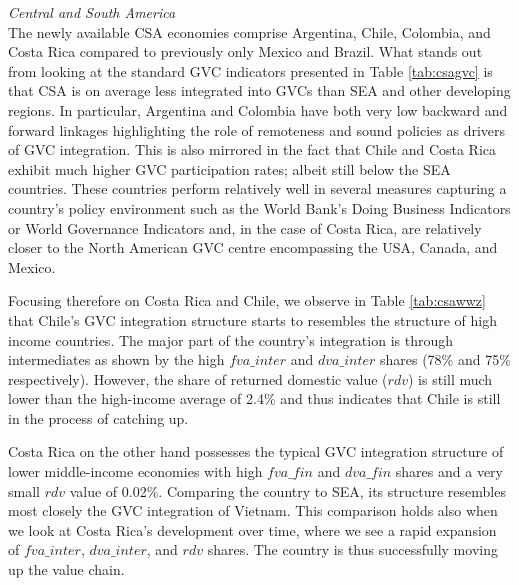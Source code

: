 \documentclass[a4paper,11pt]{article}
\begin{document}
\textit{Central and South America}\\
The newly available CSA economies comprise Argentina, Chile, Colombia, and Costa Rica compared to previously only Mexico and Brazil. What stands out from looking at the standard GVC indicators presented in Table \ref{tab:csagvc} is that CSA is on average less integrated into GVCs than SEA and other developing regions. In particular, Argentina and Colombia have both very low backward and forward linkages highlighting the role of remoteness and sound policies as drivers of GVC integration. This is also mirrored in the fact that Chile and Costa Rica exhibit much higher GVC participation rates; albeit still below the SEA countries. These countries perform relatively well in several measures capturing a country's policy environment such as the World Bank's Doing Business Indicators or World Governance Indicators and, in the case of Costa Rica, are relatively closer to the North American GVC centre encompassing the USA, Canada, and Mexico. 

Focusing therefore on Costa Rica and Chile, we observe in Table \ref{tab:csawwz} that Chile's GVC integration structure starts to resembles the structure of high income countries. The major part of the country's integration is through intermediates as shown by the high $fva\_inter$ and $dva\_inter$ shares (78\% and 75\% respectively). However, the share of returned domestic value ($rdv$) is still much lower than the high-income average of 2.4\% and thus indicates that Chile is still in the process of catching up.

Costa Rica on the other hand possesses the typical GVC integration structure of lower middle-income economies with high $fva\_fin$ and $dva\_fin$ shares and a very small $rdv$ value of 0.02\%. Comparing the country to SEA, its structure resembles most closely the GVC integration of Vietnam. This comparison holds also when we look at Costa Rica's development over time, where we see a rapid expansion of $fva\_inter$, $dva\_inter$, and $rdv$ shares. The country is thus successfully moving up the value chain.\\
\end{document}
